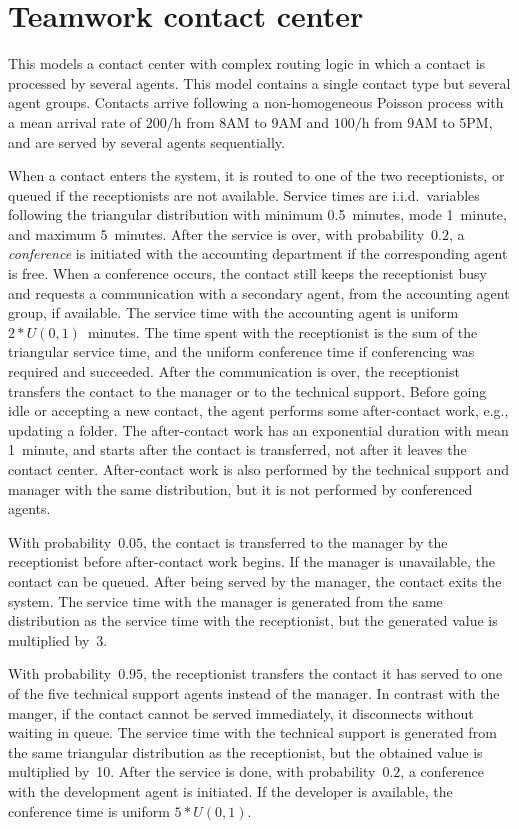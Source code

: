 \section{Teamwork contact center}
\label{sec:Teamwork}

This models a contact center with complex routing logic in which a
contact is processed by several agents.  This model contains a single
contact type but several agent groups.  Contacts arrive following
a non-homogeneous Poisson process with a mean arrival rate of $200/$h from
8AM to 9AM and $100/$h from 9AM to 5PM, and are served by several
agents sequentially.

When a contact enters the system, it is routed to one of the two
receptionists, or
queued if the receptionists are not available.  Service times are
i.i.d.\ variables following
the triangular distribution with minimum 0.5~minutes, mode 1~minute,
and maximum
5~minutes.  After the service is over,
with probability~$0.2$, a \emph{conference} is initiated with the
accounting department if the corresponding agent is free.
When a conference occurs, the contact still keeps the
receptionist busy and requests a communication with a secondary agent,
from the accounting agent group, if
available.  The service time with the accounting agent is uniform $2*U(0,
1)$~minutes.  The time spent with the receptionist is the sum of the
triangular
service time, and the uniform conference time if conferencing was
required
and succeeded.  After the communication is over, the receptionist
transfers the contact to the manager or to the
technical
support.  Before going idle or accepting a new contact, the agent
performs some after-contact work, e.g., updating a folder.  The
after-contact work has an
exponential duration with mean 1~minute, and starts after the contact
is transferred, not after it leaves the contact center.
After-contact work is also performed by the technical support and
manager with the same distribution, but it is not performed by
conferenced agents.

With probability~$0.05$, the contact is transferred to the manager by the
receptionist before after-contact work begins.  If the manager is
unavailable, the contact can be queued.  After being served by the
manager, the contact exits the system.  The service time with the
manager is generated from the same distribution as the service time
with the receptionist, but the generated value is multiplied by~3.

With probability~$0.95$, the receptionist transfers the contact it
has served to one
of the five technical support agents instead of the manager.
In contrast with the manger, if the contact cannot be served
immediately, it
disconnects without waiting in queue.  The service time with the technical
support is generated from the same triangular distribution as the
receptionist, but the obtained value is multiplied by~10.
After the service is done, with probability~$0.2$, a conference with
the
development agent is initiated. If the developer is available, the
conference time is uniform $5*U(0, 1)$.

